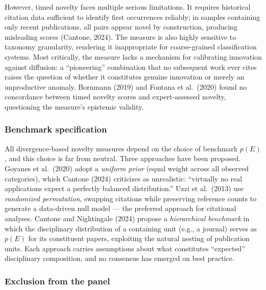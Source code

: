 \documentclass[
]{article}
\begin{document}
However, timed novelty faces multiple serious limitations. It requires
historical citation data sufficient to identify first occurrences
reliably; in samples containing only recent publications, all pairs
appear novel by construction, producing misleading scores (Cantone,
2024). The measure is also highly sensitive to taxonomy granularity,
rendering it inappropriate for coarse-grained classification systems.
Most critically, the measure lacks a mechanism for calibrating
innovation against diffusion: a ``pioneering'' combination that no
subsequent work ever cites raises the question of whether it constitutes
genuine innovation or merely an unproductive anomaly. Bornmann (2019)
and Fontana et al.~(2020) found no concordance between timed novelty
scores and expert-assessed novelty, questioning the measure's epistemic
validity.

\hypertarget{benchmark-specification}{%
\subsubsection{Benchmark specification}\label{benchmark-specification}}

All divergence-based novelty measures depend on the choice of benchmark
\(p(E)\), and this choice is far from neutral. Three approaches have
been proposed. Goyanes et al.~(2020) adopt a \emph{uniform prior} (equal
weight across all observed categories), which Cantone (2024) criticizes
as unrealistic: ``virtually no real applications expect a perfectly
balanced distribution.'' Uzzi et al.~(2013) use \emph{randomized
permutation}, swapping citations while preserving reference counts to
generate a data-driven null model --- the preferred approach for
citational analyses. Cantone and Nightingale (2024) propose a
\emph{hierarchical benchmark} in which the disciplinary distribution of
a containing unit (e.g., a journal) serves as \(p(E)\) for its
constituent papers, exploiting the natural nesting of publication units.
Each approach carries assumptions about what constitutes ``expected''
disciplinary composition, and no consensus has emerged on best practice.

\hypertarget{exclusion-from-the-panel}{%
\subsubsection{Exclusion from the
panel}\label{exclusion-from-the-panel}}
\end{document}
